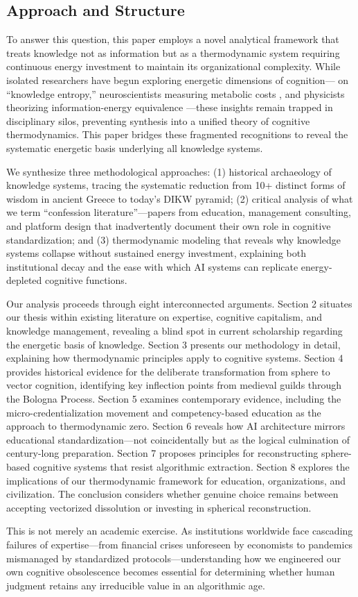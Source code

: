 \subsection{Approach and Structure}

To answer this question, this paper employs a novel analytical framework that treats knowledge not as information but as a thermodynamic system requiring continuous energy investment to maintain its organizational complexity. While isolated researchers have begun exploring energetic dimensions of cognition---\citet{bratianu2020} on ``knowledge entropy,'' neuroscientists measuring metabolic costs \citep{jamadar2025}, and physicists theorizing information-energy equivalence \citep{stonier1996}---these insights remain trapped in disciplinary silos, preventing synthesis into a unified theory of cognitive thermodynamics. This paper bridges these fragmented recognitions to reveal the systematic energetic basis underlying all knowledge systems.

We synthesize three methodological approaches: (1) historical archaeology of knowledge systems, tracing the systematic reduction from 10+ distinct forms of wisdom in ancient Greece to today's DIKW pyramid; (2) critical analysis of what we term ``confession literature''---papers from education, management consulting, and platform design that inadvertently document their own role in cognitive standardization; and (3) thermodynamic modeling that reveals why knowledge systems collapse without sustained energy investment, explaining both institutional decay and the ease with which AI systems can replicate energy-depleted cognitive functions.

Our analysis proceeds through eight interconnected arguments. Section 2 situates our thesis within existing literature on expertise, cognitive capitalism, and knowledge management, revealing a blind spot in current scholarship regarding the energetic basis of knowledge. Section 3 presents our methodology in detail, explaining how thermodynamic principles apply to cognitive systems. Section 4 provides historical evidence for the deliberate transformation from sphere to vector cognition, identifying key inflection points from medieval guilds through the Bologna Process. Section 5 examines contemporary evidence, including the micro-credentialization movement and competency-based education as the approach to thermodynamic zero. Section 6 reveals how AI architecture mirrors educational standardization---not coincidentally but as the logical culmination of century-long preparation. Section 7 proposes principles for reconstructing sphere-based cognitive systems that resist algorithmic extraction. Section 8 explores the implications of our thermodynamic framework for education, organizations, and civilization. The conclusion considers whether genuine choice remains between accepting vectorized dissolution or investing in spherical reconstruction.

This is not merely an academic exercise. As institutions worldwide face cascading failures of expertise---from financial crises unforeseen by economists to pandemics mismanaged by standardized protocols---understanding how we engineered our own cognitive obsolescence becomes essential for determining whether human judgment retains any irreducible value in an algorithmic age.
